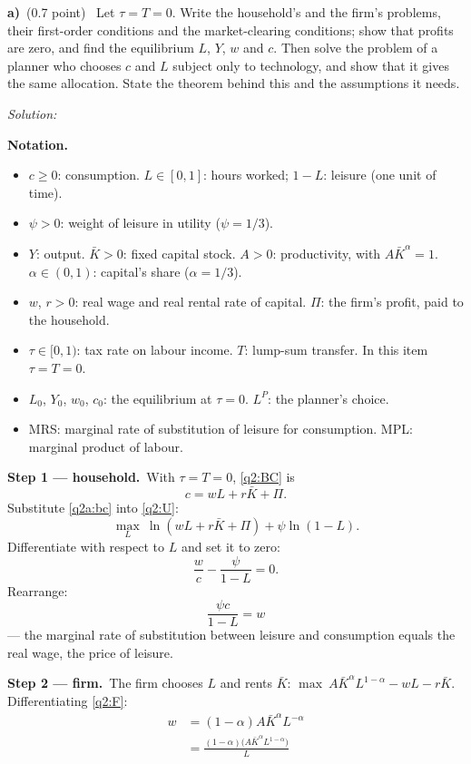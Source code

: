 \documentclass[11pt,a4paper]{article}
\newif\ifsolucoes
\newcommand{\espacoresol}{6cm}
\newcommand{\parte}[2]{\par\Needspace{6\baselineskip}\medskip\noindent\textbf{#1)}~(#2)~}
\newcommand{\resolespaco}{\ifsolucoes\else\par\textit{Solution:}\vspace{\espacoresol}\par\fi}
\newcommand{\passo}[2]{\par\smallskip\noindent\textbf{Step #1.}~#2}
\newenvironment{notacao}{\par\smallskip\noindent\textbf{Notation.}\begin{itemize}[leftmargin=1.4em,topsep=1pt,itemsep=0pt]\small}{\end{itemize}}
\begin{document}
\parte{a}{0.7 point} Let $\tau=T=0$. Write the household's and the firm's problems, their first-order
conditions and the market-clearing conditions; show that profits are zero, and find the equilibrium $L$, $Y$,
$w$ and $c$. Then solve the problem of a planner who chooses $c$ and $L$ subject only to technology, and show that
it gives the same allocation. State the theorem behind this and the assumptions it needs.
\resolespaco
\begin{sol}
\begin{notacao}
\item $c\ge0$: consumption. $L\in[0,1]$: hours worked; $1-L$: leisure (one unit of time).
\item $\psi>0$: weight of leisure in utility ($\psi=1/3$).
\item $Y$: output. $\bar K>0$: fixed capital stock. $A>0$: productivity, with $A\bar K^{\alpha}=1$.
$\alpha\in(0,1)$: capital's share ($\alpha=1/3$).
\item $w$, $r>0$: real wage and real rental rate of capital. $\Pi$: the firm's profit, paid to the household.
\item $\tau\in[0,1)$: tax rate on labour income. $T$: lump-sum transfer. In this item $\tau=T=0$.
\item $L_0$, $Y_0$, $w_0$, $c_0$: the equilibrium at $\tau=0$. $L^{P}$: the planner's choice.
\item MRS: marginal rate of substitution of leisure for consumption. MPL: marginal product of labour.
\end{notacao}
\passo{1 --- household}{With $\tau=T=0$, \eqref{q2:BC} is
\begin{equation}
c=wL+r\bar K+\Pi. \label{q2a:bc}
\end{equation}
Substitute \eqref{q2a:bc} into \eqref{q2:U}:
\[
\max_L\ \ln(wL+r\bar K+\Pi)+\psi\ln(1-L).
\]
Differentiate with respect to $L$ and set it to zero:
\[
\frac{w}{c}-\frac{\psi}{1-L}=0.
\]
Rearrange:
\begin{equation}
\boxed{\frac{\psi c}{1-L}=w} \label{q2a:hh}
\end{equation}
--- the marginal rate of substitution between leisure and consumption equals the real wage, the price of
leisure.}
\passo{2 --- firm}{The firm chooses $L$ and rents $\bar K$:
$\max\ A\bar K^{\alpha}L^{1-\alpha}-wL-r\bar K$. Differentiating \eqref{q2:F}:
\begin{align}
w &= (1-\alpha)A\bar K^{\alpha}L^{-\alpha}\nonumber\\
&= \frac{(1-\alpha)\big(A\bar K^{\alpha}L^{1-\alpha}\big)}{L}\nonumber\\

\end{align}}
\end{sol}
\end{document}
